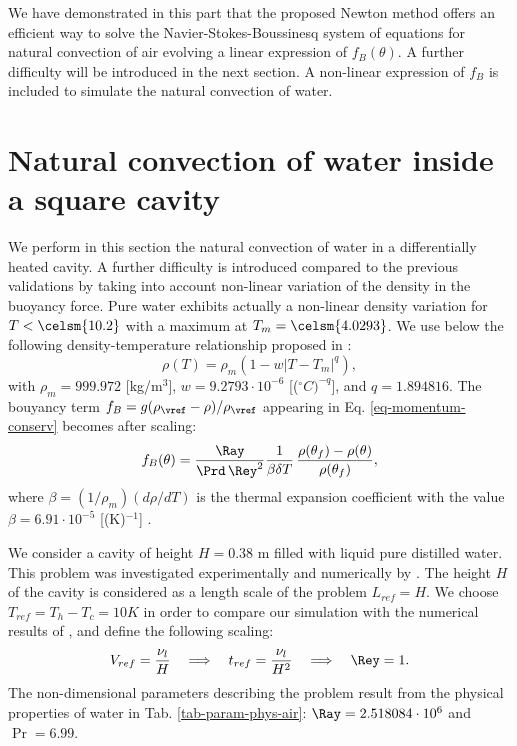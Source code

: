 We have demonstrated in this part that the proposed Newton method offers an efficient way to solve the Navier-Stokes-Boussinesq system of equations for natural convection of air evolving a linear expression of $f_B(\theta)$.
A further difficulty will be introduced in the next section. A non-linear expression of $f_B$ is included to simulate the natural convection of water.

\section{Natural convection of water inside a square cavity}\label{sec: natconv-water}
We perform in this section the natural convection of water in a differentially heated cavity. 
A further difficulty is introduced compared to the previous validations by taking into account non-linear variation of the density in the buoyancy force.
Pure water exhibits actually a non-linear density variation for $T< \celsm{10.2}$ with a maximum at $T_m= \celsm{4.0293}$. 
We use below the following density-temperature relationship  proposed in \cite{Gebhart1977}:
\begin{equation}\label{eq-dens-nonlin}
\rho(T)=\rho_m \left(1 - w \left|T - T_m\right|^q\right),
\end{equation}
with $\rho_m=999.972$ [kg/m$^3$], $w=9.2793\cdot 10^{-6}$ [($^\circ C)^{-q}$], and $q=1.894816$.
The bouyancy term $f_B = g(\rho_\vref-\rho)/\rho_\vref$ appearing in Eq. \ref{eq-momentum-conserv}  becomes after scaling:
\begin{equation}
f_B(\theta) = \frac{\Ray}{\Prd \, \Rey^2} \frac{1}{\beta \delta T}\, \frac{\rho(\theta_f)-\rho(\theta)}{\rho(\theta_f)},
\label{eq-fBnonlin}
\end{equation}
where $\beta=(1/\rho_m) \left(d\rho/dT\right)$ is the thermal expansion coefficient with the value $\beta=6.91 \cdot 10^{-5}$ [(K)$^{-1}$] \citep{Scanlon2004}.

We consider a cavity of height $H = 0.38$ m filled with liquid pure distilled water.
This problem was investigated experimentally and numerically by \cite{Giangi-2000,Kowalewski-1999,Kowalewski-2003}.
The height $H$ of the cavity is considered as a length scale of the problem $L_{ref} = H$. 
We choose $T_{ref} = T_h - T_c = 10 K$ in order to compare our simulation with the numerical results of \cite{Kowalewski-2003},
and define the following scaling:
\begin{equation} \label{eq-def-scal-1}
   V_{ref} = \frac{\nu_l}{H} 
   \quad \Longrightarrow \quad t_{ref} = \frac{\nu_l}{H^2}
   \quad \Longrightarrow \quad \Rey = 1.
\end{equation} 
The non-dimensional parameters describing the problem result from the physical properties of water in Tab. \ref{tab-param-phys-air}: $\Ray=2.518084\cdot 10^{6}$ and $\Pr=6.99$. %

